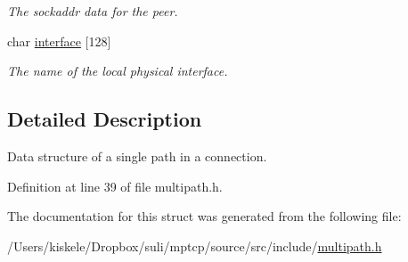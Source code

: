 \begin{DoxyCompactItemize}
\begin{DoxyCompactList}\small\item\em The sockaddr data for the peer. \end{DoxyCompactList}\item 
\hypertarget{structpath__struct_a5041981a03224a1f39d7ecab10cd2d4a}{char \hyperlink{structpath__struct_a5041981a03224a1f39d7ecab10cd2d4a}{interface} \mbox{[}128\mbox{]}}\label{structpath__struct_a5041981a03224a1f39d7ecab10cd2d4a}

\begin{DoxyCompactList}\small\item\em The name of the local physical interface. \end{DoxyCompactList}\end{DoxyCompactItemize}


\subsection{Detailed Description}
Data structure of a single path in a connection. 

Definition at line 39 of file multipath.\-h.



The documentation for this struct was generated from the following file\-:\begin{DoxyCompactItemize}
\item 
/\-Users/kiskele/\-Dropbox/suli/mptcp/source/src/include/\hyperlink{multipath_8h}{multipath.\-h}\end{DoxyCompactItemize}
